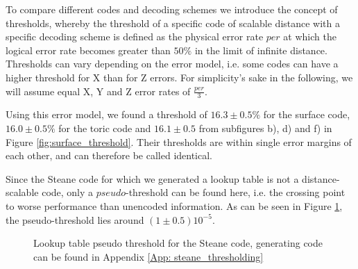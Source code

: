 To compare different codes and decoding schemes
we introduce the concept of thresholds, whereby the threshold
of a specific code of scalable distance with a specific decoding 
scheme is defined as the physical error rate $per$ at which the logical
error rate becomes greater than $50\%$ in the limit of infinite 
distance. \\
Thresholds can vary depending on the error model, i.e. 
some codes can have a higher threshold for X than for Z errors.
For simplicity's sake in the following, we will assume equal 
X, Y and Z error rates of $\frac{per}{3}$.

Using this error model, we found a threshold of $16.3\pm 0.5 \%$ for the surface code,
 $16.0\pm 0.5\%$ for the toric code and $16.1\pm0.5$ from
subfigures b), d) and f) in Figure \ref{fig:surface_threshold}.
Their thresholds are within single error margins of each other, and 
can therefore be called identical.

Since the Steane code for which we generated a lookup table is not 
a distance-scalable code, only a $pseudo$-threshold can
be found here, i.e. the crossing point to worse performance than unencoded
information. As can be seen in Figure \ref{fig: steane_threshold}, the
pseudo-threshold lies around $(1 \pm 0.5)10^{-5}$.

\begin{figure}[h!]
	\centering
	\captionsetup{justification=centering,margin=2cm}
    \hfill
	\hfill
	\caption{Lookup table pseudo threshold for the Steane code, generating code can be found in Appendix
    \ref{App: steane_thresholding}}
        
	\label{fig: steane_threshold}
\end{figure}

